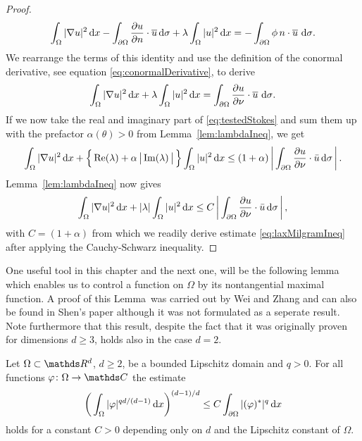 \begin{proof}
  \begin{align*}
    \int_\Omega |\nabla u|^2 \, {\operatorname{d}\!{x}} - \int_{\partial\Omega} \frac{\partial u}{\partial n} \cdot \overline u \, {\operatorname{d}\!{\sigma}} + \lambda \int_\Omega |u|^2 \, {\operatorname{d}\!{x}} = - \int_{\partial\Omega}  \phi\, n \cdot \overline u \, \, {\operatorname{d}\!{\sigma}}.
  \end{align*}
  We rearrange the terms of this identity and use the definition of the conormal derivative, see equation \eqref{eq:conormalDerivative}, to derive
  \begin{align}
    \label{eq:testedStokes}
    \int_\Omega |\nabla u|^2 \, {\operatorname{d}\!{x}} + \lambda \int_\Omega |u|^2 \, {\operatorname{d}\!{x}} = \int_{\partial\Omega} \frac{\partial u}{\partial \nu} \cdot \overline u \, \, {\operatorname{d}\!{\sigma}}.
  \end{align}
  If we now take the real and imaginary part of \eqref{eq:testedStokes} and sum them up with the prefactor $\alpha(\theta) > 0$ from Lemma~\ref{lem:lambdaIneq}, we get
  \begin{align*}
    \int_\Omega |\nabla u|^2 \, {\operatorname{d}\!{x}} + \Big\{ \operatorname{Re}(\lambda) + \alpha\, \big|\operatorname{Im}(\lambda)\,\big|\, \Big\} \int_\Omega |u|^2 \, {\operatorname{d}\!{x}}
    \leq (1 + \alpha) \, \bigg| \int_{\partial\Omega} \frac{\partial u}{\partial \nu} \cdot \bar u \, {\operatorname{d}\!{\sigma}} \, \bigg|\,.
  \end{align*}
  Lemma~\ref{lem:lambdaIneq} now gives
  \begin{align*}
    \int_\Omega |\nabla u|^2 \, {\operatorname{d}\!{x}} + |\lambda| \int_\Omega |u|^2 \, {\operatorname{d}\!{x}} \leq C\,  \bigg| \int_{\partial\Omega} \frac{\partial u}{\partial \nu} \cdot \bar u \, {\operatorname{d}\!{\sigma}}\, \bigg|\,,
  \end{align*}
  with $C = (1 + \alpha)$ from which we readily derive estimate \eqref{eq:laxMilgramIneq} after applying the Cauchy-Schwarz inequality.
\end{proof}

One useful tool in this chapter and the next one, will be the following lemma which enables us to control a function on $\Omega$ by its nontangential maximal function. 
A proof of this Lemma~was carried out by Wei and Zhang \cite[Lem.\@~3.3]{weiZhang} and can also be found in Shen's paper \cite[p.\@~418f.]{Shen2012} although it was not formulated as a seperate result.
Note furthermore that this result, despite the fact that it was originally proven for dimensions $d \geq 3$, holds also in the case $d = 2$.

\begin{lem}
  \label{lem:weiZhang}
  Let $\Omega \subset \R^d$, $d \geq 2$, be a bounded Lipschitz domain and $q > 0$.
  For all functions $\varphi \colon \Omega \to \C$ the estimate
  \begin{align}
    \label{eq:weizhangestimate}
    \bigg(\int_{\Omega} |\varphi|^{qd/(d - 1)} \, {\operatorname{d}\!{x}} \bigg)^{(d - 1)/d}
    \leq C \int_{\partial\Omega} |(\varphi)^*|^q \, {\operatorname{d}\!{x}}
  \end{align}
  holds for a constant $C > 0$ depending only on $d$ and the Lipschitz constant of $\Omega$.
\end{lem}

